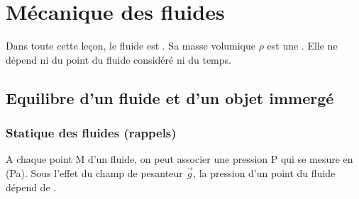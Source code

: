\setcounter{chapter}{13}
\chapter{Mécanique des fluides}

Dans toute cette leçon, le fluide est . Sa masse volumique $\rho$ est une . Elle ne dépend ni du point du fluide considéré ni du temps.
\section{Equilibre d'un fluide et d'un objet immergé}
\subsection{Statique des fluides (rappels)}

A chaque point M d'un fluide, on peut associer une pression P qui se mesure en  (Pa).
Sous l'effet du champ de pesanteur $\overrightarrow{g}$, la pression d'un point  du fluide dépend de .


